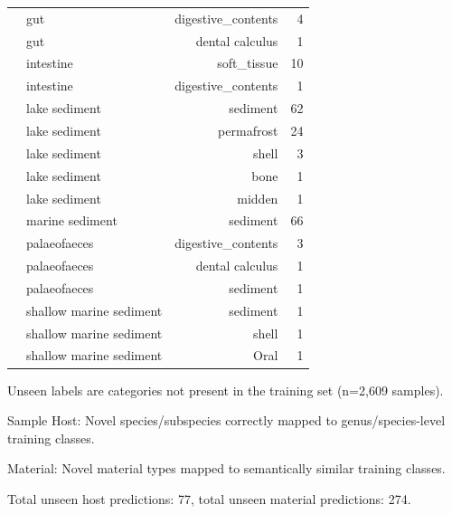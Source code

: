 \begin{table}[!t]
\begin{tabular*}{\columnwidth}{@{\extracolsep{\fill}}llrr@{\extracolsep{\fill}}}
 & gut & digestive\_contents & 4 \\
 & gut & dental calculus & 1 \\
 & intestine & soft\_tissue & 10 \\
 & intestine & digestive\_contents & 1 \\
 & lake sediment & sediment & 62 \\
 & lake sediment & permafrost & 24 \\
 & lake sediment & shell & 3 \\
 & lake sediment & bone & 1 \\
 & lake sediment & midden & 1 \\
 & marine sediment & sediment & 66 \\
 & palaeofaeces & digestive\_contents & 3 \\
 & palaeofaeces & dental calculus & 1 \\
 & palaeofaeces & sediment & 1 \\
 & shallow marine sediment & sediment & 1 \\
 & shallow marine sediment & shell & 1 \\
 & shallow marine sediment & Oral & 1 \\
\bottomrule
\end{tabular*}
\begin{tablenotes}
\item Unseen labels are categories not present in the training set (n=2,609 samples).
\item Sample Host: Novel species/subspecies correctly mapped to genus/species-level training classes.
\item Material: Novel material types mapped to semantically similar training classes.
\item Total unseen host predictions: 77, total unseen material predictions: 274.
\end{tablenotes}
\end{table}